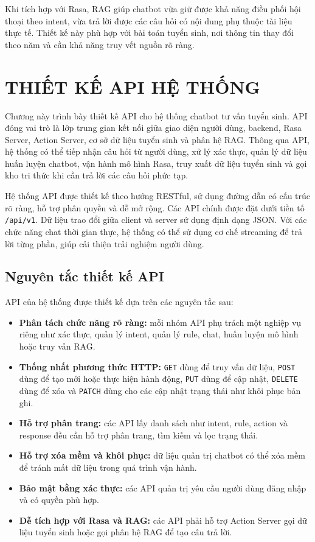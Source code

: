 \documentclass[12pt,a4paper]{report}
\begin{document}
Khi tích hợp với Rasa, RAG giúp chatbot vừa giữ được khả năng điều phối hội thoại theo intent, vừa trả lời được các câu hỏi có nội dung phụ thuộc tài liệu thực tế. Thiết kế này phù hợp với bài toán tuyển sinh, nơi thông tin thay đổi theo năm và cần khả năng truy vết nguồn rõ ràng.

\chapter{THIẾT KẾ API HỆ THỐNG}

Chương này trình bày thiết kế API cho hệ thống chatbot tư vấn tuyển sinh. API đóng vai trò là lớp trung gian kết nối giữa giao diện người dùng, backend, Rasa Server, Action Server, cơ sở dữ liệu tuyển sinh và phân hệ RAG. Thông qua API, hệ thống có thể tiếp nhận câu hỏi từ người dùng, xử lý xác thực, quản lý dữ liệu huấn luyện chatbot, vận hành mô hình Rasa, truy xuất dữ liệu tuyển sinh và gọi kho tri thức khi cần trả lời các câu hỏi phức tạp.

Hệ thống API được thiết kế theo hướng RESTful, sử dụng đường dẫn có cấu trúc rõ ràng, hỗ trợ phân quyền và dễ mở rộng. Các API chính được đặt dưới tiền tố \texttt{/api/v1}. Dữ liệu trao đổi giữa client và server sử dụng định dạng JSON. Với các chức năng chat thời gian thực, hệ thống có thể sử dụng cơ chế streaming để trả lời từng phần, giúp cải thiện trải nghiệm người dùng.

\section{Nguyên tắc thiết kế API}

API của hệ thống được thiết kế dựa trên các nguyên tắc sau:

\begin{itemize}
    \item \textbf{Phân tách chức năng rõ ràng:} mỗi nhóm API phụ trách một nghiệp vụ riêng như xác thực, quản lý intent, quản lý rule, chat, huấn luyện mô hình hoặc truy vấn RAG.
    \item \textbf{Thống nhất phương thức HTTP:} \texttt{GET} dùng để truy vấn dữ liệu, \texttt{POST} dùng để tạo mới hoặc thực hiện hành động, \texttt{PUT} dùng để cập nhật, \texttt{DELETE} dùng để xóa và \texttt{PATCH} dùng cho các cập nhật trạng thái như khôi phục bản ghi.
    \item \textbf{Hỗ trợ phân trang:} các API lấy danh sách như intent, rule, action và response đều cần hỗ trợ phân trang, tìm kiếm và lọc trạng thái.
    \item \textbf{Hỗ trợ xóa mềm và khôi phục:} dữ liệu quản trị chatbot có thể xóa mềm để tránh mất dữ liệu trong quá trình vận hành.
    \item \textbf{Bảo mật bằng xác thực:} các API quản trị yêu cầu người dùng đăng nhập và có quyền phù hợp.
    \item \textbf{Dễ tích hợp với Rasa và RAG:} các API phải hỗ trợ Action Server gọi dữ liệu tuyển sinh hoặc gọi phân hệ RAG để tạo câu trả lời.
\end{itemize}
\end{document}
